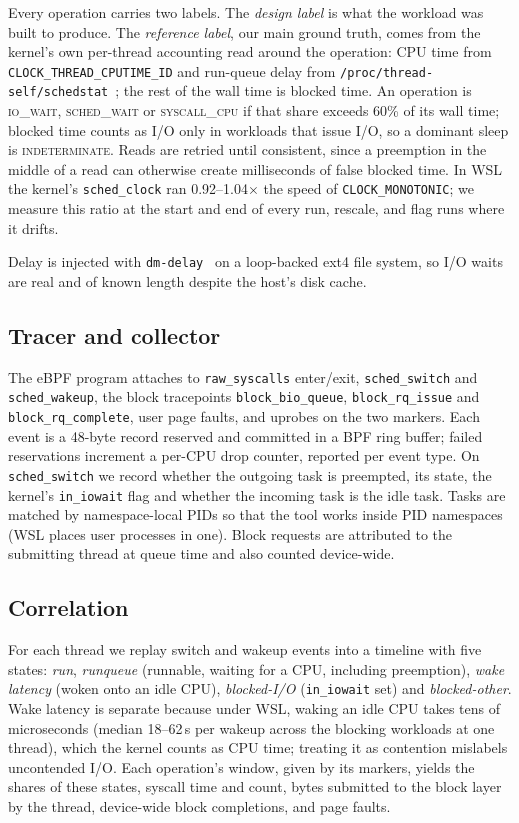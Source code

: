 \documentclass[conference]{IEEEtran}
\newcommand{\lbl}[1]{\textsc{#1}}
\newcommand{\IO}{\lbl{io\_wait}}
\newcommand{\SCHED}{\lbl{sched\_wait}}
\newcommand{\CPU}{\lbl{syscall\_cpu}}
\newcommand{\IND}{\lbl{indeterminate}}
\begin{document}
Every operation carries two labels. The \emph{design label} is what the workload was built to produce. The \emph{reference label}, our main ground truth, comes from the kernel's own per-thread accounting read around the operation: CPU time from \texttt{CLOCK\_THREAD\_CPUTIME\_ID} and run-queue delay from \texttt{/proc/thread-self/schedstat}~\cite{schedstats}; the rest of the wall time is blocked time. An operation is \IO{}, \SCHED{} or \CPU{} if that share exceeds 60\% of its wall time; blocked time counts as I/O only in workloads that issue I/O, so a dominant sleep is \IND. Reads are retried until consistent, since a preemption in the middle of a read can otherwise create milliseconds of false blocked time. In WSL the kernel's \texttt{sched\_clock} ran 0.92--1.04$\times$ the speed of \texttt{CLOCK\_MONOTONIC}; we measure this ratio at the start and end of every run, rescale, and flag runs where it drifts.

Delay is injected with \texttt{dm-delay}~\cite{dmdelay} on a loop-backed ext4 file system, so I/O waits are real and of known length despite the host's disk cache.

\subsection{Tracer and collector}
The eBPF program attaches to \texttt{raw\_syscalls} enter/exit, \texttt{sched\_switch} and \texttt{sched\_wakeup}, the block tracepoints \texttt{block\_bio\_queue}, \texttt{block\_rq\_issue} and \texttt{block\_rq\_complete}, user page faults, and uprobes on the two markers. Each event is a 48-byte record reserved and committed in a BPF ring buffer; failed reservations increment a per-CPU drop counter, reported per event type. On \texttt{sched\_switch} we record whether the outgoing task is preempted, its state, the kernel's \texttt{in\_iowait} flag and whether the incoming task is the idle task. Tasks are matched by namespace-local PIDs so that the tool works inside PID namespaces (WSL places user processes in one). Block requests are attributed to the submitting thread at queue time and also counted device-wide.

\subsection{Correlation}
For each thread we replay switch and wakeup events into a timeline with five states: \emph{run}, \emph{runqueue} (runnable, waiting for a CPU, including preemption), \emph{wake latency} (woken onto an idle CPU), \emph{blocked-I/O} (\texttt{in\_iowait} set) and \emph{blocked-other}. Wake latency is separate because under WSL, waking an idle CPU takes tens of microseconds (median 18--62\,\textmu s per wakeup across the blocking workloads at one thread), which the kernel counts as CPU time; treating it as contention mislabels uncontended I/O. Each operation's window, given by its markers, yields the shares of these states, syscall time and count, bytes submitted to the block layer by the thread, device-wide block completions, and page faults.
\end{document}
